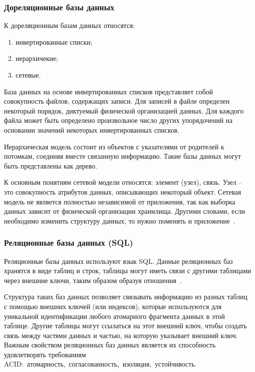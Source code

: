 \subsubsection{Дореляционные базы данных}

К дореляционным базам данных относятся:

\begin{enumerate}[label*=---]
	\item инвертированные списки;
	\item иерархичекие;
	\item сетевые.
\end{enumerate}

База данных на основе инвертированных списков представляет собой совокупность файлов, содержащих записи. Для записей в файле определен некоторый порядок, диктуемый физической организацией данных. Для каждого файла может быть определено произвольное число других упорядочений на основании значений некоторых инвертированных списков. 

Иерархическая модель  состоит из объектов с указателями от родителей к потомкам, соединяя вместе связанную информацию. Такие базы данных могут быть представлены как дерево.

К основным понятиям сетевой модели относятся: элемент (узел), связь. Узел -- это совокупность атрибутов данных, описывающих некоторый объект. Сетевая модель не является полностью независимой от приложения, так как выборка данных зависит от физической организации хранилища. Другими словами, если необходимо изменить структуру данных, то нужно поменять и приложение~\cite{Begg}.

\subsubsection{Реляционные базы данных (SQL)}

Реляционные базы данных используют язык SQL. Данные реляционных баз хранятся в виде таблиц и строк, таблицы могут иметь связи с другими таблицами через внешние ключи, таким образом образуя отношения~\cite{sql}. 

Структура таких баз данных позволяет связывать информацию из разных таблиц с помощью внешних ключей (или индексов), которые используются для уникальной идентификации любого атомарного фрагмента данных в этой таблице. Другие таблицы могут ссылаться на этот внешний ключ, чтобы создать связь между частями данных и частью, на которую указывает внешний ключ. Важным свойством реляционных баз данных является их способность удовлетворять требованиям ACID:~атомарность,~согласованность,~изоляция,~устойчивость.

